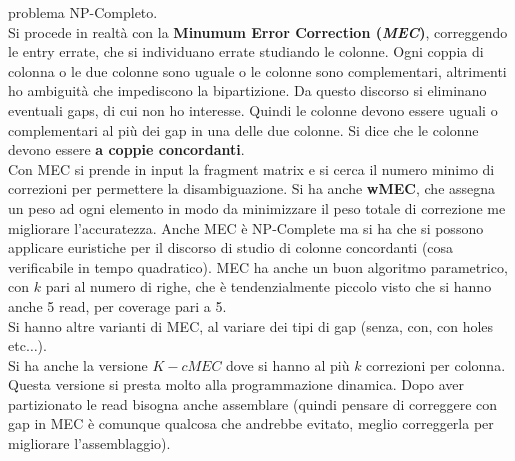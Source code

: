 \documentclass[a4paper,12pt, oneside]{book}
\begin{document}
problema NP-Completo.\\
Si procede in realtà con la \textbf{Minumum Error Correction (\textit{MEC})},
correggendo le entry errate, che si individuano errate studiando le
colonne. Ogni coppia di colonna o le due colonne sono uguale o le colonne sono
complementari, altrimenti ho ambiguità che impediscono la bipartizione. Da
questo discorso si eliminano eventuali gaps, di cui non ho interesse. Quindi le
colonne devono essere uguali o complementari al più dei gap in una delle due
colonne. Si dice che le colonne devono essere \textbf{a coppie concordanti}.\\  
Con MEC si prende in input la fragment matrix e si cerca il numero minimo di
correzioni per permettere la disambiguazione. Si ha anche \textbf{wMEC}, che
assegna 
un peso ad ogni elemento in modo da minimizzare il peso totale di correzione me
migliorare l'accuratezza. Anche MEC è NP-Complete ma si ha che si possono
applicare euristiche per il discorso di studio di colonne concordanti (cosa
verificabile in tempo quadratico). MEC ha anche un buon algoritmo parametrico,
con $k$ pari al numero di righe, che è tendenzialmente piccolo visto che si
hanno anche 5 read, per coverage pari a 5.\\
Si hanno altre varianti di MEC, al variare dei tipi di gap (senza, con, con
holes etc$\ldots$).\\
Si ha anche la versione $K-cMEC$ dove si hanno al più $k$ correzioni per
colonna. Questa versione si presta molto alla programmazione dinamica. 
Dopo aver partizionato le read bisogna anche assemblare (quindi pensare di
correggere con gap in MEC è comunque qualcosa che andrebbe evitato, meglio
correggerla per migliorare l'assemblaggio).
\end{document}
